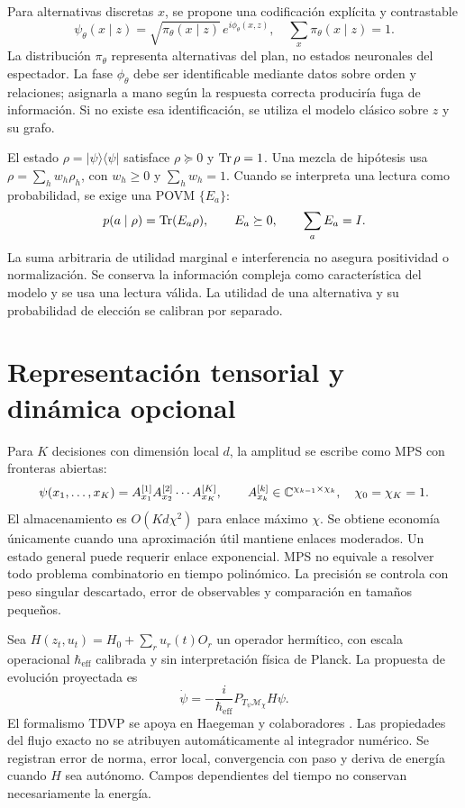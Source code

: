 Para alternativas discretas $x$, se propone una codificación explícita y contrastable
\begin{equation}
 \psi_\theta(x\mid z)=\sqrt{\pi_\theta(x\mid z)}\,e^{i\phi_\theta(x,z)},\quad
 \sum_x\pi_\theta(x\mid z)=1.
\end{equation}
La distribución $\pi_\theta$ representa alternativas del plan, no estados neuronales del espectador. La fase $\phi_\theta$ debe ser identificable mediante datos sobre orden y relaciones; asignarla a mano según la respuesta correcta produciría fuga de información. Si no existe esa identificación, se utiliza el modelo clásico sobre $z$ y su grafo.

El estado $\rho=|\psi\rangle\langle\psi|$ satisface $\rho\succeq0$ y $\operatorname{Tr}\rho=1$. Una mezcla de hipótesis usa $\rho=\sum_h w_h\rho_h$, con $w_h\geq0$ y $\sum_h w_h=1$. Cuando se interpreta una lectura como probabilidad, se exige una POVM $\{E_a\}$:
\begin{equation}
 p(a\mid\rho)=\operatorname{Tr}(E_a\rho),\qquad E_a\succeq0,\qquad\sum_aE_a=I.
\end{equation}
La suma arbitraria de utilidad marginal e interferencia no asegura positividad o normalización. Se conserva la información compleja como característica del modelo y se usa una lectura válida. La utilidad de una alternativa y su probabilidad de elección se calibran por separado.

\section{Representación tensorial y dinámica opcional}
Para $K$ decisiones con dimensión local $d$, la amplitud se escribe como MPS con fronteras abiertas:
\begin{equation}
 \psi(x_1,\ldots,x_K)=A^{[1]}_{x_1}A^{[2]}_{x_2}\cdots A^{[K]}_{x_K},\qquad
 A^{[k]}_{x_k}\in\mathbb{C}^{\chi_{k-1}\times\chi_k},\quad\chi_0=\chi_K=1.
\end{equation}
El almacenamiento es $O(Kd\chi^2)$ para enlace máximo $\chi$. Se obtiene economía únicamente cuando una aproximación útil mantiene enlaces moderados. Un estado general puede requerir enlace exponencial. MPS no equivale a resolver todo problema combinatorio en tiempo polinómico. La precisión se controla con peso singular descartado, error de observables y comparación en tamaños pequeños.

Sea $H(z_t,u_t)=H_0+\sum_r u_r(t)O_r$ un operador hermítico, con escala operacional $\hbar_{\mathrm{eff}}$ calibrada y sin interpretación física de Planck. La propuesta de evolución proyectada es
\begin{equation}
 \dot\psi=-\frac{i}{\hbar_{\mathrm{eff}}}P_{T_\psi\mathcal M_\chi}H\psi.
\end{equation}
El formalismo TDVP se apoya en Haegeman y colaboradores \cite{tdvp}. Las propiedades del flujo exacto no se atribuyen automáticamente al integrador numérico. Se registran error de norma, error local, convergencia con paso y deriva de energía cuando $H$ sea autónomo. Campos dependientes del tiempo no conservan necesariamente la energía.

